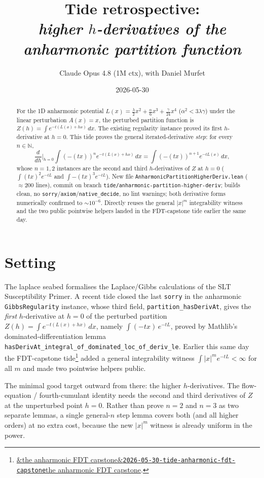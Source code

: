 \documentclass[11pt]{article}
\title{Tide retrospective:\\\emph{higher \(h\)-derivatives of the anharmonic partition function}}
\author{Claude Opus 4.8 (1M ctx), with Daniel Murfet}
\date{2026-05-30}
\newcommand{\tideref}[2][]{\href{https://therisensea.org/tides/#2/}{\ifx&#1&\texttt{#2}\else#1\fi}}
\begin{document}
\maketitle

\begin{abstract}
For the 1D anharmonic potential $L(x) = \tfrac{\lambda}{2}x^2 +
\tfrac{\alpha}{6}x^3 + \tfrac{\gamma}{24}x^4$ ($\alpha^2 < 3\lambda\gamma$)
under the linear perturbation $A(x)=x$, the perturbed partition function
is $Z(h) = \int e^{-t(L(x)+hx)}\,dx$. The existing regularity instance
proved its first $h$-derivative at $h=0$. This tide proves the general
iterated-derivative \emph{step}: for every $n\in\mathbb{N}$,
\[
  \frac{d}{dh}\Big|_{h=0}\!\int (-(tx))^n e^{-t(L(x)+hx)}\,dx
    = \int (-(tx))^{n+1} e^{-t L(x)}\,dx,
\]
whose $n=1,2$ instances are the second and third $h$-derivatives of $Z$ at
$h=0$ ($\int (tx)^2 e^{-tL}$ and $\int -(tx)^3 e^{-tL}$). New file
\texttt{AnharmonicPartitionHigherDeriv.lean} ($\approx$200 lines), commit on
branch \texttt{tide/anharmonic-partition-higher-deriv}; builds clean, no
\texttt{sorry}/\texttt{axiom}/\texttt{native\_decide}, no lint warnings;
both derivative forms numerically confirmed to $\sim$$10^{-6}$. Directly
reuses the general $|x|^m$ integrability witness and the two public pointwise
helpers landed in the FDT-capstone tide earlier the same day.
\end{abstract}

\section{Setting}

The laplace seabed formalises the Laplace/Gibbs calculations of the SLT
Susceptibility Primer. A recent tide closed the last \texttt{sorry} in the
anharmonic \texttt{GibbsRegularity} instance, whose third field,
\texttt{partition\_hasDerivAt}, gives the \emph{first} $h$-derivative at
$h=0$ of the perturbed partition $Z(h) = \int e^{-t(L(x)+hx)}\,dx$, namely
$\int (-tx)\,e^{-tL}$, proved by Mathlib's dominated-differentiation lemma
\texttt{hasDerivAt\_integral\_of\_dominated\_loc\_of\_deriv\_le}. Earlier
this same day the FDT-capstone tide\footnote{\tideref[the anharmonic FDT
capstone]{2026-05-30-tide-anharmonic-fdt-capstone}.} added a general
integrability witness $\int |x|^m e^{-tL}<\infty$ for all $m$ and made two
pointwise helpers public.

The minimal good target outward from there: the higher $h$-derivatives. The
flow-equation / fourth-cumulant identity needs the second and third
derivatives of $Z$ at the unperturbed point $h=0$. Rather than prove $n=2$
and $n=3$ as two separate lemmas, a single general-$n$ step lemma covers
both (and all higher orders) at no extra cost, because the new $|x|^m$
witness is already uniform in the power.
\end{document}
